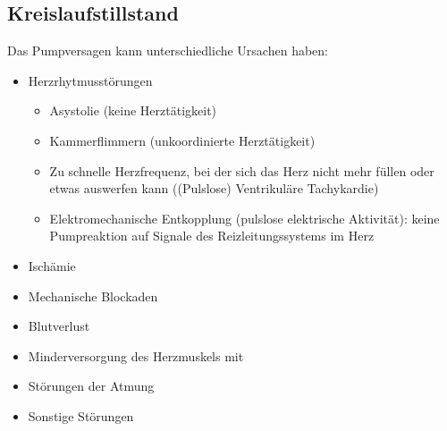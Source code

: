 \subsection{Kreislaufstillstand}
\label{bkm:RefHeading42514602}
\label{topic:kreislaufstillstand}


{\TxBeschreibung}
{%
Das Pumpversagen kann unterschiedliche Ursachen haben:
\begin{itemize}
  \item Herzrhytmusstörungen
  \begin{itemize}
    \item Asystolie (keine Herztätigkeit)
    \item Kammerflimmern (unkoordinierte Herztätigkeit)
    \item Zu schnelle Herzfrequenz, bei der sich das Herz
    nicht mehr füllen oder etwas auswerfen kann ((Pulslose)
    Ventrikuläre Tachykardie)
    \item Elektromechanische
    Entkopplung (pulslose elektrische Aktivität): keine
    Pumpreaktion auf Signale des Reizleitungssystems im Herz
  \end{itemize}
  \item Ischämie
  \item Mechanische Blockaden
  \item Blutverlust
\end{itemize}
}
{}
{}
{}
{}

{
\begin{itemize}
  \item Minderversorgung des Herzmuskels mit \par
  \item Störungen der Atmung\par
  \item Sonstige Störungen\par
\end{itemize}
}{}{}{}{}

